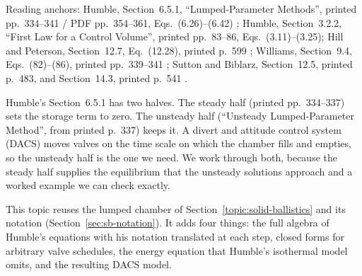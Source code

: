 
Reading anchors: Humble, Section~6.5.1, ``Lumped-Parameter Methods'',
printed pp.~334--341 / PDF pp.~354--361, Eqs.~(6.26)--(6.42)
\cite{humble}; Humble, Section~3.2.2, ``First Law for a Control
Volume'', printed pp.~83--86, Eqs.~(3.11)--(3.25); Hill and Peterson,
Section~12.7, Eq.~(12.28), printed p.~599 \cite{hillpeterson};
Williams, Section~9.4, Eqs.~(82)--(86), printed pp.~339--341
\cite{williams}; Sutton and Biblarz, Section~12.5, printed p.~483,
and Section~14.3, printed p.~541 \cite{sutton}.

Humble's Section~6.5.1 has two halves. The steady half (printed
pp.~334--337) sets the storage term to zero. The unsteady half
(``Unsteady Lumped-Parameter Method'', from printed p.~337) keeps it.
A divert and attitude control system (DACS) moves valves on the
time scale on which the chamber fills and empties, so the unsteady half
is the one we need. We work through both, because the steady half
supplies the equilibrium that the unsteady solutions approach and a
worked example we can check exactly.

This topic reuses the lumped chamber of
Section~\ref{topic:solid-ballistics} and its notation
(Section~\ref{sec:sb-notation}). It adds four things: the full algebra
of Humble's equations with his notation translated at each step, closed
forms for arbitrary valve schedules, the energy equation that Humble's
isothermal model omits, and the resulting DACS model.

